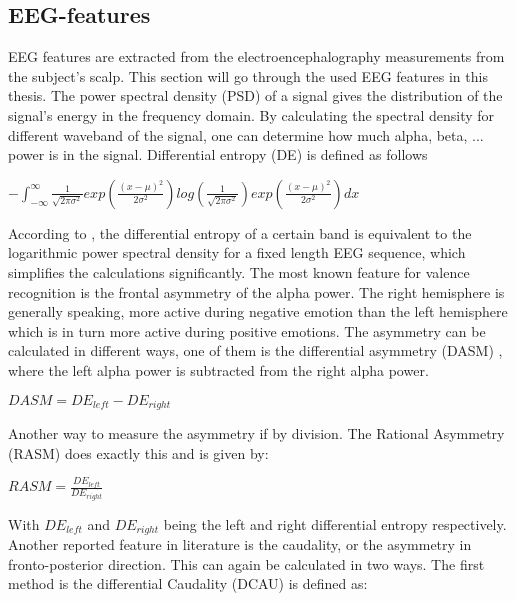 \subsection{EEG-features}
EEG features are extracted from the electroencephalography measurements from the subject's scalp. This section will go through the used EEG features in this thesis.
\npar
The power spectral density (PSD)  of a signal gives the distribution of the signal's energy in the frequency domain. By calculating the spectral density for different waveband of the signal, one can determine how much alpha, beta, ... power is in the signal.
\npar
Differential entropy (DE) is defined as follows \citep{killyPaper} \\
\begin{center}
$ - \int_{-\infty}^{\infty} \frac{1}{\sqrt{2\pi\sigma^2}} exp(\frac{(x-\mu)^2}{2\sigma^2}) log(\frac{1}{\sqrt{2\pi\sigma^2}}) exp(\frac{(x-\mu)^2}{2\sigma^2})dx$
\end{center}
According to \citep{diffEnt}, the differential entropy of a certain band is equivalent to the logarithmic power spectral density for a fixed length EEG sequence, which simplifies the calculations significantly.
\npar
The most known feature for valence recognition is the frontal asymmetry of the alpha power\cite{GivenPaper}.
The right hemisphere is generally speaking, more active during negative emotion than the left hemisphere which is in turn more active during positive emotions\cite{RealTimeEEGEmotion,EEGDatasets,killyPaper}. The asymmetry can be calculated in different ways, one of them is the differential asymmetry (DASM) , where the left alpha power is subtracted from the right alpha power.
\begin{center}
$DASM = DE_{left} - DE_{right}$
\end{center}
Another way to measure the asymmetry if by division. The Rational Asymmetry (RASM)  does exactly this and is given by: \\
\begin{center}
$RASM = \frac{DE_{left}}{DE_{right}}$
\end{center}
With $DE_{left}$ and $DE_{right}$ being the left and right differential entropy respectively.
\npar
Another reported feature in literature is the caudality, or the asymmetry in fronto-posterior direction\cite{caudality}. This can again be calculated in two ways. The first method is the differential Caudality (DCAU)  is defined as: \\
